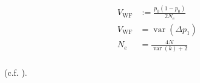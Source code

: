 \documentclass[11pt]{article}
\DeclareMathOperator{\var}{var}
\begin{document}
\begin{align}
  V_\text{WF} &:= \frac{p_0(1-p_0)}{2N_e} \\
  V_\text{WF} &= \var(\Delta p_1) \\
  N_e &= \frac{4N}{\var(k) + 2} \\
\end{align}

(c.f. \cite{Wright1938-tv}).













\end{document}
